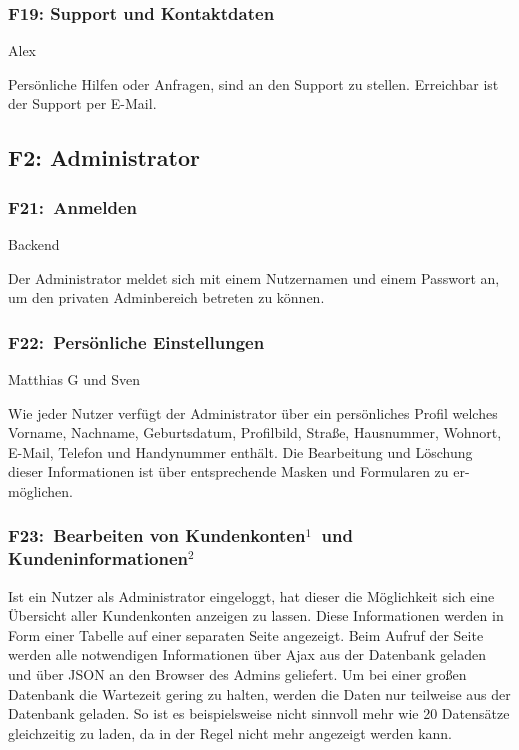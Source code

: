 \documentclass[10pt,a4paper]{scrartcl}
\begin{document}
\subsubsection*{F19: Support und Kontaktdaten}

Alex

Persönliche Hilfen oder Anfragen, sind an den Support zu stellen. Erreichbar ist der Support per E-Mail. 


\subsection{F2: Administrator}
\subsubsection*{F21: Anmelden}

Backend

Der Administrator meldet sich mit einem Nutzernamen und einem Passwort an, um den privaten Adminbereich betreten zu können.

\subsubsection*{F22: Persönliche Einstellungen}

Matthias G und Sven

Wie jeder Nutzer verfügt der Administrator über ein persönliches Profil welches Vorname, Nachname, Geburtsdatum, Profilbild, Straße, Hausnummer, Wohnort, E-Mail, Telefon und Handynummer enthält. Die Bearbeitung und Löschung dieser Informationen ist über entsprechende Masken und Formularen zu er-möglichen.

\subsubsection*{F23: Bearbeiten von Kundenkonten$^1$ und Kundeninformationen$^2$}

Ist ein Nutzer als Administrator eingeloggt, hat dieser die Möglichkeit sich eine Übersicht
aller Kundenkonten anzeigen zu lassen. Diese Informationen werden in Form einer Tabelle auf 
einer separaten Seite angezeigt. Beim Aufruf der Seite werden alle notwendigen Informationen 
über Ajax aus der Datenbank geladen und über JSON an den Browser des Admins geliefert. Um
bei einer großen Datenbank die Wartezeit gering zu halten, werden die Daten nur teilweise
aus der Datenbank geladen. So ist es beispielsweise nicht sinnvoll mehr wie 20 Datensätze 
gleichzeitig zu laden, da in der Regel nicht mehr angezeigt werden kann.
\end{document}
